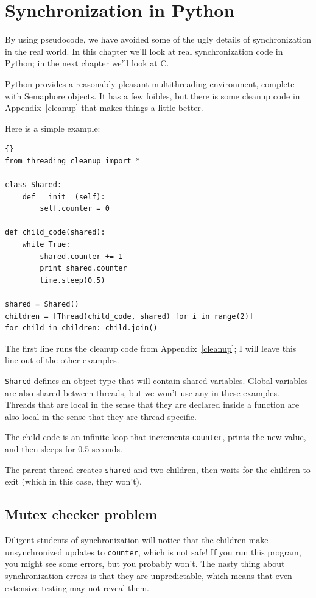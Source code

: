 \documentclass{book}
\begin{document}
\chapter{Synchronization in Python}
\label{pysync}

By using pseudocode, we have avoided some of the ugly
details of synchronization in the real world.  In this chapter
we'll look at real synchronization code in Python; in the
next chapter we'll look at C.

Python provides a reasonably pleasant multithreading environment,
complete with Semaphore objects.  It has
a few foibles, but there is some cleanup code in Appendix~\ref{cleanup}
that makes things a little better.

Here is a simple example:

\begin{lstlisting}[caption={}]{}
from threading_cleanup import *

class Shared:
    def __init__(self):
        self.counter = 0

def child_code(shared):
    while True:
        shared.counter += 1
        print shared.counter
        time.sleep(0.5)

shared = Shared()
children = [Thread(child_code, shared) for i in range(2)]
for child in children: child.join()
\end{lstlisting}

The first line runs the cleanup code from Appendix~\ref{cleanup};
I will leave this line out of the other examples.

{\tt Shared} defines an object type that will contain shared variables.
Global variables are also shared between threads, but we won't
use any in these examples.  Threads that are local in the sense
that they are declared inside a function are also local in the
sense that they are thread-specific.

The child code is an infinite loop that increments {\tt counter},
prints the new value, and then sleeps for 0.5 seconds.

The parent thread creates {\tt shared} and two children,
then waits for the children to exit (which in this case, they won't).

\section{Mutex checker problem}

Diligent students of synchronization will notice that the
children make unsynchronized updates to {\tt counter}, which
is not safe!  If you run this program, you might see some
errors, but you probably won't.  The nasty thing about synchronization
errors is that they are unpredictable, which means that even
extensive testing may not reveal them.
\end{document}
